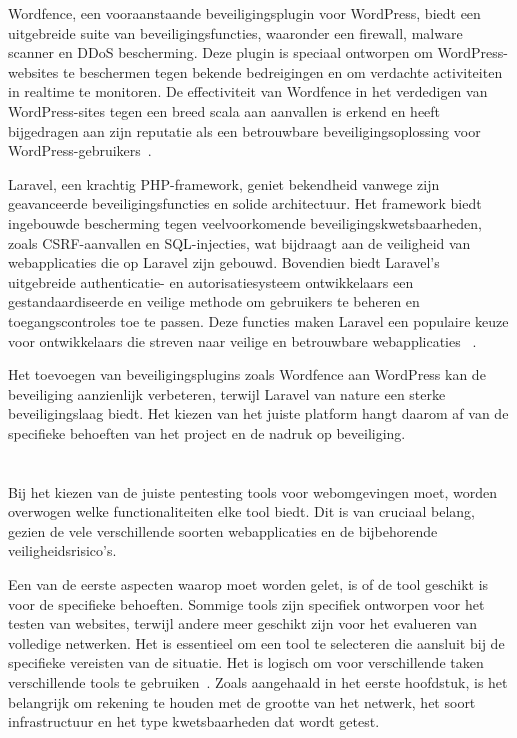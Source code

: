 Wordfence, een vooraanstaande beveiligingsplugin voor WordPress, biedt een uitgebreide suite van beveiligingsfuncties, waaronder een 
firewall, malware scanner en DDoS bescherming. Deze plugin is speciaal ontworpen om WordPress-websites te beschermen tegen bekende 
bedreigingen en om verdachte activiteiten in realtime te monitoren. De effectiviteit van Wordfence in het verdedigen van WordPress-sites 
tegen een breed scala aan aanvallen is erkend en heeft bijgedragen aan zijn reputatie als een betrouwbare beveiligingsoplossing voor 
WordPress-gebruikers~\autocite{277144}.

Laravel, een krachtig PHP-framework, geniet bekendheid vanwege zijn geavanceerde beveiligingsfuncties en solide architectuur. Het 
framework biedt ingebouwde bescherming tegen veelvoorkomende beveiligingskwetsbaarheden, zoals CSRF-aanvallen en SQL-injecties, wat 
bijdraagt aan de veiligheid van webapplicaties die op Laravel zijn gebouwd. Bovendien biedt Laravel's uitgebreide authenticatie- en 
autorisatiesysteem ontwikkelaars een gestandaardiseerde en veilige methode om gebruikers te beheren en toegangscontroles toe te passen. 
Deze functies maken Laravel een populaire keuze voor ontwikkelaars die streven naar veilige en betrouwbare webapplicaties
~\autocite{Adamu2020}.

Het toevoegen van beveiligingsplugins zoals Wordfence aan WordPress kan de beveiliging aanzienlijk verbeteren, terwijl Laravel van nature een 
sterke beveiligingslaag biedt. Het kiezen van het juiste platform hangt daarom af van de specifieke behoeften van het project en de nadruk op beveiliging.
\section{}
\label{sec:Webomgevingen}
Bij het kiezen van de juiste pentesting tools voor webomgevingen moet, worden overwogen welke functionaliteiten 
elke tool biedt. Dit is van cruciaal belang, gezien de vele verschillende soorten webapplicaties en de bijbehorende veiligheidsrisico's.

Een van de eerste aspecten waarop moet worden gelet, is of de tool geschikt is voor de specifieke behoeften. Sommige tools 
zijn specifiek ontworpen voor het testen van websites, terwijl andere meer geschikt zijn voor het evalueren van volledige 
netwerken. Het is essentieel om een tool te selecteren die aansluit bij de specifieke vereisten van de situatie. Het 
is logisch om voor verschillende taken verschillende tools te gebruiken~\autocite{Deepikakongara2023}.
Zoals aangehaald in het eerste hoofdstuk, is het belangrijk om rekening te houden met de grootte van het netwerk, 
het soort infrastructuur en het type kwetsbaarheden dat wordt getest.

